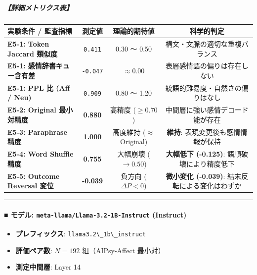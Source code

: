 \subparagraph{【詳細メトリクス表】}
\begin{center}
\small
\begin{tabular}{lccc}
\toprule
\textbf{実験条件 / 監査指標} & \textbf{測定値} & \textbf{理論的期待値} & \textbf{科学的判定} \\
\midrule
\textbf{E5-1: Token Jaccard 類似度} & \texttt{0.411} & 0.30 〜 0.50 & 構文・文脈の適切な重複バランス \\
\textbf{E5-1: 感情辞書キュー含有差} & \texttt{-0.047} & $\approx 0.00$ & 表層感情語の偏りは存在しない \\
\textbf{E5-1: PPL 比 (Aff / Neu)} & \texttt{0.909} & 0.80 〜 1.20 & 統語的難易度・自然さの偏りはなし \\
\textbf{E5-2: Original 最小対精度} & \textbf{0.880} & 高精度 ($\ge 0.70$) & 中間層に強い感情デコード能が存在 \\
\textbf{E5-3: Paraphrase 精度} & \textbf{1.000} & 高度維持 ($\approx$ Original) & \textbf{維持}: 表現変更後も感情情報が保持 \\
\textbf{E5-4: Word Shuffle 精度} & \textbf{0.755} & 大幅崩壊 ($\rightarrow 0.50$) & \textbf{大幅低下 (-0.125)}: 語順破壊により精度低下 \\
\textbf{E5-5: Outcome Reversal 変位} & \textbf{-0.039} & 負方向 ($\Delta P < 0$) & \textbf{微小変化 (-0.039)}: 結末反転による変化はわずか \\
\bottomrule
\end{tabular}
\end{center}


\vspace{0.5em}\hrule\vspace{0.5em}

\paragraph{■ モデル: \texttt{meta-llama/Llama-3.2-1B-Instruct} (Instruct)}
\begin{itemize}
\item \textbf{プレフィックス}: \texttt{llama3.2\textbackslash{}\_1b\textbackslash{}\_instruct}
\item \textbf{評価ペア数}: $N=192$ 組（AIPsy-Affect 最小対）
\item \textbf{測定中間層}: Layer 14
\end{itemize}

